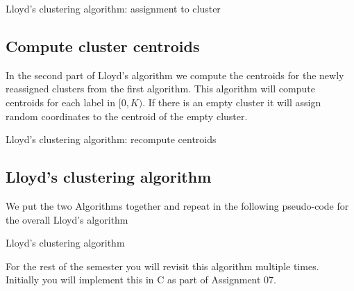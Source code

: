 \begin{algorithm}[htbp!]
\caption{Lloyd's clustering algorithm: assignment to cluster}\label{lloydAssignment.alg}
\vspace{4pt}
\algrule
\For{$i\in [0,N)$}{
  $c_i =\argmin\limits_{k\in 0,\ldots,K-1}\left( (x_i - \hat{x}_k)^2+ (y_i - \hat{y}_k)^2 \right)$
  }
\end{algorithm}

\newpage
\subsection{Compute cluster centroids}

In the second part of Lloyd's algorithm we compute the centroids for the newly reassigned clusters from the first algorithm. This algorithm will compute centroids for each label in $[0,K)$. If there is an empty cluster it will assign random coordinates to the centroid of the empty cluster.

\begin{algorithm}[htbp!]
\caption{Lloyd's clustering algorithm: recompute centroids}\label{lloydCentroid.alg}
\vspace{4pt}
\algrule
 \For{$k\in [0,K)$}{
   $\hat{x}_k = 0$\; $\hat{y}_k = 0$\; $C_k = 0$\;
 }
 \For{$i\in [0,N)$}{
    $j:=c_i$\;
    $\hat{x}_j = \hat{x}_j + x_i$\;
    $\hat{y}_j = \hat{y}_j + y_i$\;
    $C_j = C_j + 1$\;
  }
  \For{$k\in [0, K)$}{
    \If{$C_k = 0$}{
      $\hat{x}_k = \hat{x}_k/C_k$\; $\hat{y}_k = \hat{y}_k/C_k$\;
    }
    \Else{
      $\hat{x}_k = \mbox{drand}()$\; $\hat{y}_k = \mbox{drand}()$\;
    }
}
\end{algorithm}

\newpage
\subsection{Lloyd's clustering algorithm}
We put the two Algorithms together and repeat  in the following pseudo-code for the overall Lloyd's algorithm

\begin{algorithm}[htbp!]
\caption{Lloyd's clustering algorithm}
\label{lloyd.alg}
\vspace{4pt}
\algrule
\end{algorithm}

For the rest of the semester you will revisit this algorithm multiple times. Initially you will implement this in C as part of Assignment 07.

\printbibliography[heading=subbibliography]